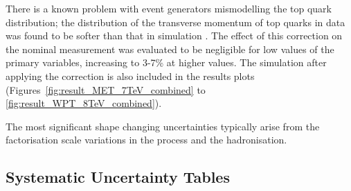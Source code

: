 There is a known problem with event generators mismodelling the top quark \pt distribution; the distribution
of the transverse momentum of top quarks in data was found to be softer than that in simulation
\cite{Chatrchyan:2012saa}. The effect of this correction on the nominal measurement was evaluated to be
negligible for low values of the primary variables, increasing to 3-7\% at higher values. The \MADGRAPH
simulation after applying the \tquark \pt correction is also included in the results plots
(Figures~\ref{fig:result_MET_7TeV_combined} to \ref{fig:result_WPT_8TeV_combined}).

The most significant shape changing uncertainties typically arise from the factorisation scale variations in
the \ttbar process and the hadronisation.

\subsection{Systematic Uncertainty Tables}
\label{ss:systematic_uncertainty_tables}


\begin{landscape}

\end{landscape}
\begin{landscape}

\end{landscape}




\begin{landscape}

\end{landscape}
\begin{landscape}

\end{landscape}



